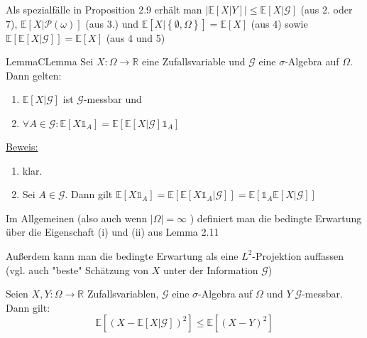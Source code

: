 Als spezialfälle in Proposition 2.9 erhält man $ \left| \mathbb{E} \left[ X | Y \right] \right| \leq \mathbb{E} \left[ X | \mathcal{G} \right] $ (aus 2. oder 7), $ \mathbb{E} \left[ X | \mathcal{P} (\omega) \right] $ (aus 3.) und $ \mathbb{E} \left[ X | \left\{ \emptyset, \Omega \right\} \right] = \mathbb{E} \left[ X \right] $ (aus 4) sowie $ \mathbb{E} \left[ \mathbb{E} \left[ X | \mathcal{G} \right] \right] = \mathbb{E} \left[ X \right]$ (aus 4 und 5)

\begin{ibox}[2.11]{Lemma}{CLemma}
    Sei $ X : \Omega \to \mathbb{R} $ eine Zufallsvariable und $ \mathcal{G} $ eine $\sigma$-Algebra auf $ \Omega $. Dann gelten: 
		\begin{enumerate}[label=\alph*)]
			\item $ \mathbb{E} \left[ X | \mathcal{G} \right] $ ist $ \mathcal{G}$-messbar und 
			\item $ \forall A \in \mathcal{G}: \mathbb{E} \left[ X \mathds{1}_A \right] = \mathbb{E} \left[ \mathbb{E} \left[ X | \mathcal{G} \right] \mathds{1}_A \right] $ 
		\end{enumerate}
\end{ibox}
\underline{Beweis:} 
\begin{enumerate}[label=\alph*)]
	\item klar.
	\item Sei $ A \in \mathcal{G} $. Dann gilt $ \mathbb{E} \left[ X \mathds{1}_{A} \right] = \mathbb{E} \left[ \mathbb{E} \left[ X \mathds{1}_{A} | \mathcal{G} \right] \right] = \mathbb{E} \left[ \mathds{1}_{A} \mathbb{E} \left[ X | \mathcal{G} \right] \right]$ 
\end{enumerate}
Im Allgemeinen (also auch wenn $ |\Omega| = \infty $ ) definiert man die bedingte Erwartung über die Eigenschaft (i) und (ii) aus Lemma 2.11 


Außerdem kann man die bedingte Erwartung als eine $ L^2 $-Projektion auffassen (vgl. auch "beste" Schätzung von $ X $ unter der
Information $ \mathcal{G} $)

Seien $ X, Y : \Omega \to \mathbb{R} $ Zufallsvariablen, $ \mathcal{G} $ eine $\sigma$-Algebra auf $ \Omega $ und $ Y \; \mathcal{G}$-messbar. Dann gilt: 
$$ \mathbb{E} \left[ \left( X - \mathbb{E} \left[ X | \mathcal{G} \right] \right)^{2} \right] \leq \mathbb{E} \left[  \left( X - Y \right)^{2} \right] $$

\centerline{}

